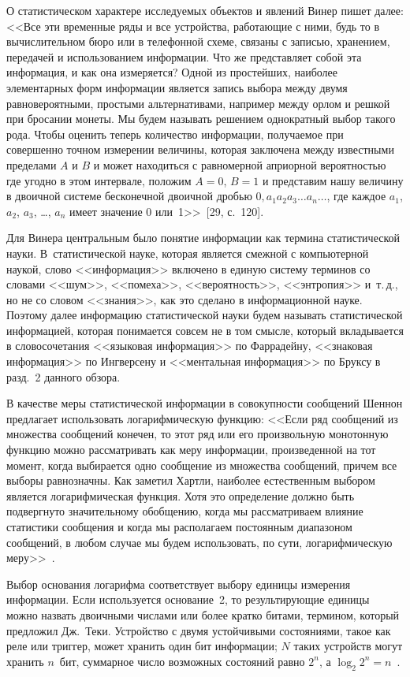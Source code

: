 \begin{multicols}{2}
      О статистическом характере исследуемых объектов и явлений Винер пишет далее: <<Все
эти временные ряды и все устройства, работающие с ними, будь то в вычислительном бюро или
в телефонной схеме, связаны с записью, хранением, передачей и использованием информации.
Что же представляет собой эта информация, и как она измеряется? Одной из простейших,
наиболее элементарных форм информации является запись выбора между двумя
равновероятными, простыми альтернативами, например между орлом и решкой при бросании
монеты. Мы будем называть решением однократный выбор такого рода. Чтобы оценить теперь
количество информации, получаемое при совершенно точном измерении величины, которая
заключена между известными пределами $A$ и $B$ и может находиться с равномерной
априорной вероятностью где угодно в этом интервале, положим $A = 0$, $B = 1$ и представим
нашу величину в двоичной системе бесконечной двоичной дробью $0{,} a_1a_2a_3\ldots
a_n\ldots$, где каждое $a_1$, $a_2$, $a_3$, \ldots , $a_n$  имеет значение 0 
или~1>>~[29, с.~120].

      Для Винера центральным было понятие информации как термина статистической науки.
В~ста\-тистической науке, которая является смежной с компьютерной наукой, слово
<<информация>> включено в единую систему терминов со словами <<шум>>, <<помеха>>,
<<вероятность>>, <<энтропия>> и~т.\,д., но не со словом <<знания>>, как это сделано в
информационной науке. Поэтому далее информацию статистической науки будем называть
статистической информацией, которая понимается совсем не в том смысле, который
вкладывается в словосочетания <<языковая информация>> по Фаррадейну, <<знаковая
информация>> по Ингверсену и <<ментальная информация>> по Бруксу в разд.~2 данного
обзора.

      В качестве меры статистической информации в совокупности сообщений Шеннон
предлагает использовать логарифмическую функцию: <<Если ряд сообщений из множества
сообщений конечен, то этот ряд или его произвольную монотонную функцию можно
рассматривать как меру информации, произведенной на тот момент, когда выбирается одно
сообщение из множества сообщений, причем все выборы равнозначны. Как заметил Хартли,
наиболее естественным выбором является логарифмическая функция. Хотя это определение
должно быть подвергнуто значительному обобщению, когда мы рассматриваем влияние
статистики сообщения и когда мы располагаем постоянным диапазоном сообщений, в любом
случае мы будем использовать, по сути, логарифмическую меру>>~\cite{30za}.

      Выбор основания логарифма соответствует выбору единицы измерения информации.
Если ис\-поль\-зу\-ет\-ся основание~2, то результирующие единицы можно назвать двоичными
числами или \mbox{более} кратко битами, термином, который предложил Дж.~Теки. Устройство с
двумя устойчивыми состояниями, такое как реле или триггер, может хранить один бит
информации; $N$ таких устройств могут хранить $n$~бит, суммарное число возможных
состояний равно $2^n$, а $\log_2 2^n = n$~\cite{30za}.


\end{multicols}
